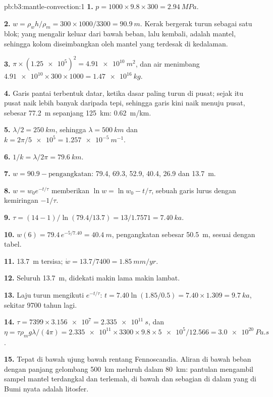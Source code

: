 \begin{solution}{pb:b3:mantle-convection:1}
\textbf{1.} $p = 1000\times9.8\times300 = \qty{2.94}{MPa}$.

\textbf{2.} $w = \rho_wh/\rho_m = 300\times1000/3300 = \qty{90.9}{m}$. Kerak
bergerak turun sebagai satu blok; yang mengalir keluar dari bawah beban, lalu kembali,
adalah mantel, sehingga kolom diseimbangkan oleh mantel yang terdesak di kedalaman.

\textbf{3.} $\pi\times(\num{1.25e5})^2 = \qty{4.91e10}{m^2}$, dan air
menimbang $\num{4.91e10}\times300\times1000 = \qty{1.47e16}{kg}$.

\textbf{4.} Garis pantai terbentuk datar, ketika dasar paling turun di
pusat; sejak itu pusat naik lebih banyak daripada tepi, sehingga garis kini
naik menuju pusat, sebesar \qty{77.2}{m} sepanjang \qty{125}{km}:
\qty{0.62}{m/km}.

\textbf{5.} $\lambda/2 = \qty{250}{km}$, sehingga $\lambda = \qty{500}{km}$ dan $k =
2\pi/\num{5e5} = \qty{1.257e-5}{m^{-1}}$.

\textbf{6.} $1/k = \lambda/2\pi = \qty{79.6}{km}$.

\textbf{7.} $w = 90.9 - \text{pengangkatan}$: 79.4, 69.3, 52.9, 40.4, 26.9 dan
\qty{13.7}{m}.

\textbf{8.} $w = w_0e^{-t/\tau}$ memberikan $\ln w = \ln w_0 - t/\tau$, sebuah garis lurus
dengan kemiringan $-1/\tau$.

\textbf{9.} $\tau = (14 - 1)/\ln(79.4/13.7) = 13/1.7571 = \qty{7.40}{ka}$.

\textbf{10.} $w(6) = 79.4\,e^{-5/7.40} = \qty{40.4}{m}$, pengangkatan sebesar
\qty{50.5}{m}, sesuai dengan tabel.

\textbf{11.} \qty{13.7}{m} tersisa; $\dot w = 13.7/7400 = \qty{1.85}{mm/yr}$.

\textbf{12.} Seluruh \qty{13.7}{m}, didekati makin lama makin lambat.

\textbf{13.} Laju turun mengikuti $e^{-t/\tau}$: $t = 7.40\ln(1.85/0.5) =
7.40\times1.309 = \qty{9.7}{ka}$, sekitar 9700 tahun lagi.

\textbf{14.} $\tau = 7399\times\num{3.156e7} = \qty{2.335e11}{s}$, dan $\eta =
\tau\rho_mg\lambda/(4\pi) = \num{2.335e11}\times3300\times9.8\times\num{5e5}/
12.566 = \qty{3.0e20}{Pa.s}$.

\textbf{15.} Tepat di bawah ujung bawah rentang Fennoscandia. Aliran
di bawah beban dengan panjang gelombang \qty{500}{km} meluruh dalam \qty{80}{km}: 
pantulan mengambil sampel mantel terdangkal dan terlemah, di bawah dan sebagian di dalam
yang di Bumi nyata adalah litosfer.


\end{solution}
